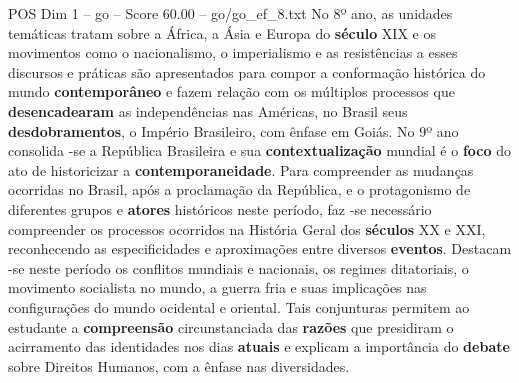 \begin{textsample}{POS Dim 1 – go – Score 60.00 – go/go\_ef\_8.txt}
No 8º ano, as unidades temáticas tratam sobre a África, a Ásia e Europa do \textbf{século} XIX e os movimentos como o nacionalismo, o imperialismo e as resistências a esses discursos e práticas são apresentados para compor a conformação histórica do mundo \textbf{contemporâneo} e fazem relação com os múltiplos processos que \textbf{desencadearam} as independências nas Américas, no Brasil seus \textbf{desdobramentos}, o Império Brasileiro, com ênfase em Goiás.
No 9º ano consolida -se a República Brasileira e sua \textbf{contextualização} mundial é o \textbf{foco} do ato de historicizar a \textbf{contemporaneidade}.
Para compreender as mudanças ocorridas no Brasil, após a proclamação da República, e o protagonismo de diferentes grupos e \textbf{atores} históricos neste período, faz -se necessário compreender os processos ocorridos na História Geral dos \textbf{séculos} XX e XXI, reconhecendo as especificidades e aproximações entre diversos \textbf{eventos}.
Destacam -se neste período os conflitos mundiais e nacionais, os regimes ditatoriais, o movimento socialista no mundo, a guerra fria e suas implicações nas configurações do mundo ocidental e oriental.
Tais conjunturas permitem ao estudante a \textbf{compreensão} circunstanciada das \textbf{razões} que presidiram o acirramento das identidades nos dias \textbf{atuais} e explicam a importância do \textbf{debate} sobre Direitos Humanos, com a ênfase nas diversidades.

\end{textsample}
